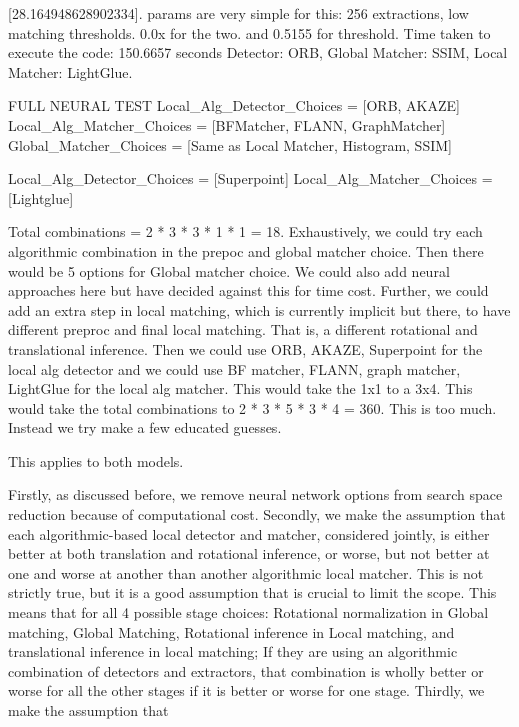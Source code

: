 [28.164948628902334]. params are very simple for this: 256 extractions, low matching thresholds. 0.0x for the two. and 0.5155 for threshold. 
Time taken to execute the code: 150.6657 seconds
Detector: ORB, Global Matcher: SSIM, Local Matcher: LightGlue. 







FULL NEURAL TEST
Local\_Alg\_Detector\_Choices = [ORB, AKAZE]
Local\_Alg\_Matcher\_Choices = [BFMatcher, FLANN, GraphMatcher]
Global\_Matcher\_Choices = [Same as Local Matcher, Histogram, SSIM]

Local\_Alg\_Detector\_Choices = [Superpoint]
Local\_Alg\_Matcher\_Choices = [Lightglue]

Total combinations = 2 * 3 * 3 * 1 * 1 = 18. Exhaustively, we could try each algorithmic combination in the prepoc and global matcher choice. Then there would be 5 options for Global matcher choice. We could also add neural approaches here but have decided against this for time cost. Further, we could add an extra step in local matching, which is currently implicit but there, to have different preproc and final local matching. That is, a different rotational and translational inference. Then we could use ORB, AKAZE, Superpoint for the local alg detector and we could use BF matcher, FLANN, graph matcher, LightGlue for the local alg matcher. This would take the 1x1 to a 3x4. This would take the total combinations to 2 * 3 * 5 * 3 * 4 = 360. This is too much. Instead we try make a few educated guesses. 

This applies to both models. 

Firstly, as discussed before, we remove neural network options from search space reduction because of computational cost. 
Secondly, we make the assumption that each algorithmic-based local detector and matcher, considered jointly, is either better at both translation and rotational inference, or worse, but not better at one and worse at another than another algorithmic local matcher. This is not strictly true, but it is a good assumption that is crucial to limit the scope. This means that for all 4 possible stage choices: Rotational normalization in Global matching, Global Matching, Rotational inference in Local matching, and translational inference in local matching; If they are using an algorithmic combination of detectors and extractors, that combination is wholly better or worse for all the other stages if it is better or worse for one stage. 
Thirdly, we make the assumption that 



